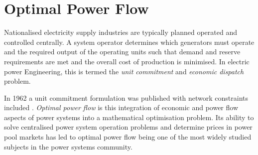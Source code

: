 
\chapter{Optimal Power Flow}
\label{sec:opf}
Nationalised electricity supply industries are typically planned operated and
controlled centrally.  A system operator determines which generators must
operate and the required output of the operating units such that demand and
reserve requirements are met and the overall cost of production is minimised.
In electric power Engineering, this is termed the \textit{unit commitment} and
\textit{economic dispatch} problem.

In 1962 a unit commitment formulation was published with network constraints
included \cite{carpentier:opf}.  \textit{Optimal power flow} is this
integration of economic and power flow aspects of power systems into a
mathematical optimisation problem.  Its ability to solve centralised power
system operation problems and determine prices in power pool markets has led
to optimal power flow being one of the most widely studied subjects in the
power systems community.

